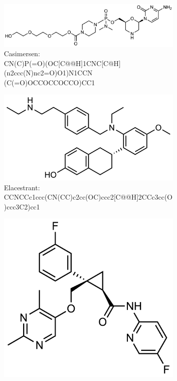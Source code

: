 \documentclass[pdflatex,sn-mathphys-num]{sn-jnl}%
\theoremstyle{thmstyleone}%
\theoremstyle{thmstyletwo}%
\theoremstyle{thmstylethree}%
\begin{document}
\begin{figure}[h!]
    \captionsetup[subfigure]{labelformat=empty}
    \begin{subfigure}[t]{1.0\textwidth}
        \includegraphics[scale=0.725]{media/SI_study/1f.casimersen_f.png}
        \caption{Casimersen: \\ \small CN(C)P(=O)(OC[C@@H]1CNC[C@H](n2ccc(N)nc2=O)O1)N1CCN \\ (C(=O)OCCOCCOCCO)CC1}
    \end{subfigure}
    \hfill
    \vspace{0.5cm}
    \begin{subfigure}[t]{1.0\textwidth}
        \includegraphics[scale=0.725]{media/SI_study/2f.elacestrant_f.png}
        \caption{Elacestrant: \\ \small CCNCCc1ccc(CN(CC)c2cc(OC)ccc2[C@@H]2CCc3cc(O)ccc3C2)cc1}
    \end{subfigure}
    \hfill
    \vspace{0.5cm}
    \begin{subfigure}[t]{1.0\textwidth}
        \includegraphics[scale=0.725]{media/SI_study/3f.lemborexant_f.png}

\end{subfigure}
\end{figure}
\end{document}
